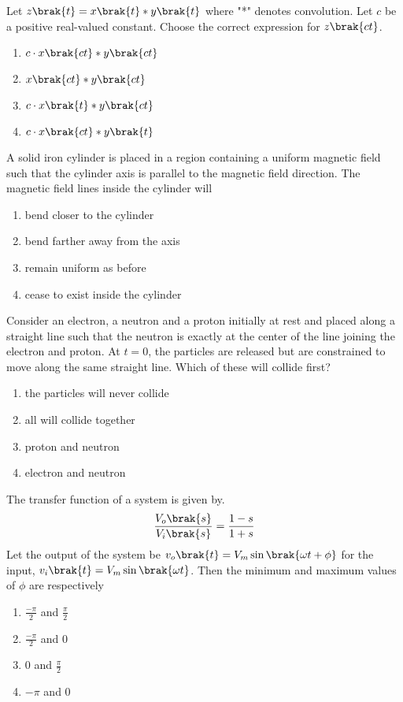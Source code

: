 \item Let $z\brak{t}=x\brak{t}*y\brak{t}$ where "*" denotes convolution. Let $c$ be a positive real-valued constant. Choose the correct expression for $z\brak{ct}$. 
\begin{enumerate}
    \item $c\cdot x\brak{ct}*y\brak{ct}$
    \item $x\brak{ct}*y\brak{ct}$
    \item $c\cdot x\brak{t}*y\brak{ct}$
    \item $c\cdot x\brak{ct}*y\brak{t}$
\end{enumerate}
\item A solid iron cylinder is placed in a region containing a uniform magnetic field such that the cylinder axis is parallel to the magnetic field direction. The magnetic field lines inside the cylinder will
\begin{enumerate}
    \item bend closer to the cylinder 
    \item bend farther away from the axis
    \item remain uniform as before 
    \item cease to exist inside the cylinder
\end{enumerate}
\item Consider an electron, a neutron and a proton initially at rest and placed along a straight line such that the neutron is exactly at the center of the line joining the electron and proton. At $t=0$, the particles are released but are constrained to move along the same straight line. Which of these will collide first? 
\begin{enumerate}
    \item the particles will never collide
    \item all will collide together
    \item proton and neutron
    \item electron and neutron
\end{enumerate}
\item The transfer function of a system is given by. $$\frac{V_o\brak{s}}{V_i\brak{s}}=\frac{1-s}{1+s}$$ Let the output of the system be $v_o\brak{t}=V_m\sin\brak{\omega t+\phi}$ for the input, $v_i\brak{t}=V_m\sin \brak{\omega t}$. Then the minimum and maximum values of $\phi$  are respectively
\begin{enumerate}
    \item $\frac{-\pi}{2}$ and $\frac{\pi}{2}$
    \item $\frac{-\pi}{2}$ and $0$
    \item $0$ and $\frac{\pi}{2}$
    \item $-\pi$ and $0$
\end{enumerate}
